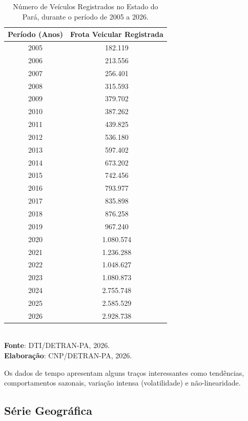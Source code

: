 \begin{table}[H]
    \centering
    {
    \caption{Número de Veículos Registrados no Estado do Pará, durante o período de 2005 a 2026.}
    \label{frotamoto1}
    \vspace{0.1cm}
\begin{tabular}{c|c}
  \hline\hline
  Período (Anos)   & Frota Veicular Registrada \\
  \hline\hline
  2005   & 182.119     \\
  2006   & 213.556     \\
  2007   &  256.401    \\
  2008   &  315.593    \\
  2009   &  379.702    \\
  2010   & 387.262     \\
  2011   & 439.825     \\
  2012   & 536.180     \\
  2013   & 597.402     \\
  2014   & 673.202     \\
  2015   & 742.456     \\
  2016   & 793.977     \\
  2017   & 835.898     \\
  2018   & 876.258     \\
  2019   & 967.240     \\
  2020   & 1.080.574   \\
  2021   & 1.236.288   \\
  2022   & 1.048.627   \\
  2023   & 1.080.873   \\
  2024   & 2.755.748    \\
  2025   & 2.585.529   \\
  2026   & 2.928.738  \\
  \hline\hline
\end{tabular}}
\\
\hspace{-2.5cm}
\textbf{Fonte}: DTI/DETRAN-PA, 2026. \\
\hspace{-1.6cm}
\textbf{Elaboração}: CNP/DETRAN-PA, 2026.
\end{table}

Os dados de tempo apresentam alguns traços interessantes como tendências, comportamentos sazonais, variação intensa (volatilidade) e não-li\-ne\-a\-ri\-da\-de.\vskip0.3cm


\newpage
\subsection{Série Geográfica}


